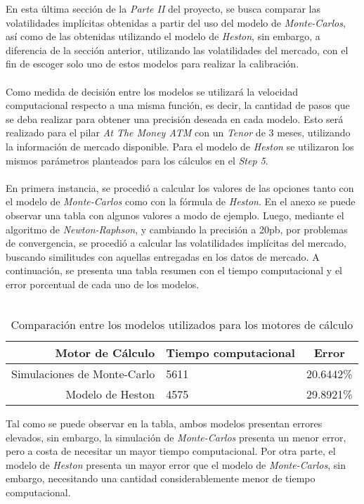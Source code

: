 \noindent En esta última sección de la \textit{Parte II} del proyecto, se busca comparar las volatilidades implícitas obtenidas a partir del uso del modelo de \textit{Monte-Carlos}, así como de las obtenidas utilizando el modelo de \textit{Heston}, sin embargo, a diferencia de la sección anterior, utilizando las volatilidades del mercado, con el fin de escoger solo uno de estos modelos para realizar la calibración.\\\\
Como medida de decisión entre los modelos se utilizará la velocidad computacional respecto a una misma función, es decir, la cantidad de pasos que se deba realizar para obtener una precisión deseada en cada modelo. Esto será realizado para el pilar \textit{At The Money ATM} con un \textit{Tenor} de 3 meses, utilizando la información de mercado disponible. Para el modelo de \textit{Heston} se utilizaron los mismos parámetros planteados para los cálculos en el \textit{Step 5}.\\\\
\noindent En primera instancia, se procedió a calcular los valores de las opciones tanto con el modelo de \textit{Monte-Carlos} como con la fórmula de \textit{Heston}. En el anexo se puede observar una tabla con algunos valores a modo de ejemplo. Luego, mediante el algoritmo de \textit{Newton-Raphson}, y cambiando la precisión a 20pb, por problemas de convergencia, se procedió a calcular las volatilidades implícitas del mercado, buscando similitudes con aquellas entregadas en los datos de mercado. A continuación, se presenta una tabla resumen con el tiempo computacional y el error porcentual de cada uno de los modelos.\\\\

\begin{table}[h]
\begin{center}
\begin{tabular}{| r | l | c |}
\hline 
Motor de Cálculo & Tiempo computacional & Error \\ \hline
Simulaciones de Monte-Carlo & 5611 & 20.6442\%  \\
Modelo de Heston  & 4575 & 29.8921\%\\ \hline
\end{tabular}
\caption{Comparación entre los modelos utilizados para los motores de cálculo}
\label{tab:fruta}
\end{center}
\end{table}

\noindent Tal como se puede observar en la tabla, ambos modelos presentan errores elevados, sin embargo, la simulación de \textit{Monte-Carlos} presenta un menor error, pero a costa de necesitar un mayor tiempo computacional. Por otra parte, el modelo de \textit{Heston} presenta un mayor error que el modelo de \textit{Monte-Carlos}, sin embargo, necesitando una cantidad considerablemente menor de tiempo computacional.\\\\

